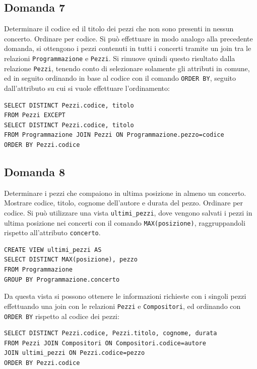 \documentclass{article}
\numberwithin{equation}{subsection}
\begin{document}
\subsection{Domanda 7}
Determinare il codice ed il titolo dei pezzi che non sono presenti in nessun concerto. Ordinare per codice. Si può effettuare in modo analogo alla precedente domanda, si ottengono i pezzi contenuti in tutti i 
concerti tramite un join tra le relazioni \verb|Programmazione| e \verb|Pezzi|. Si rimuove quindi questo risultato dalla relazione \verb|Pezzi|, tenendo conto di selezionare solamente gli attributi in comune, ed 
in seguito ordinando in base al codice con il comando \verb|ORDER BY|, seguito dall'attributo su cui si vuole effettuare l'ordinamento: 
\begin{verbatim}
SELECT DISTINCT Pezzi.codice, titolo
FROM Pezzi EXCEPT
SELECT DISTINCT Pezzi.codice, titolo
FROM Programmazione JOIN Pezzi ON Programmazione.pezzo=codice
ORDER BY Pezzi.codice 
\end{verbatim}

\subsection{Domanda 8}
Determinare i pezzi che compaiono in ultima posizione in almeno un concerto. Mostrare codice, titolo, cognome dell'autore e durata del pezzo. Ordinare per codice. Si può utilizzare una vista \verb|ultimi_pezzi|, 
dove vengono salvati i pezzi in ultima posizione nei concerti con il comando \verb|MAX(posizione)|, raggruppandoli rispetto all'attributo \verb|concerto|. 
\begin{verbatim}
CREATE VIEW ultimi_pezzi AS
SELECT DISTINCT MAX(posizione), pezzo
FROM Programmazione 
GROUP BY Programmazione.concerto
\end{verbatim}
Da questa vista si possono ottenere le informazioni richieste con i singoli pezzi effettuando una join con le relazioni \verb|Pezzi| e \verb|Compositori|, ed ordinando con \verb|ORDER BY| rispetto al codice dei 
pezzi:
\begin{verbatim}
SELECT DISTINCT Pezzi.codice, Pezzi.titolo, cognome, durata
FROM Pezzi JOIN Compositori ON Compositori.codice=autore
JOIN ultimi_pezzi ON Pezzi.codice=pezzo
ORDER BY Pezzi.codice
\end{verbatim}
\end{document}
